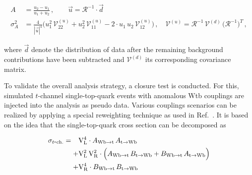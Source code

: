 \begin{align}
A&=\frac{u_2-u_1}{u_1+u_2}\,,\qquad \vec{u}=\mathcal{R}^{-1}\cdot\vec{d}\\
\sigma^2_{A}&=\frac{4}{|\vec{u}|^4}\Big(u_1^2\,\mathcal{V}^{(u)}_{22}+u_2^2\,\mathcal{V}^{(u)}_{11}-2\cdot u_1\,u_{2}\,\mathcal{V}^{(u)}_{12}\Big)\,,\quad\mathcal{V}^{(u)}=\mathcal{R}^{-1}\,\mathcal{V}^{(d)}\,\big(\mathcal{R}^{-1}\big)^{T}\,,
\end{align}

where $\vec{d}$ denote the distribution of data after the remaining background contributions have been subtracted and $\mathcal{V}^{(d)}$ its corresponding covariance matrix.

To validate the overall analysis strategy, a closure test is conducted. For this, simulated $t$-channel single-top-quark events with anomalous Wtb couplings are injected into the analysis as pseudo data. Various couplings scenarios can be realized by applying a special reweighting technique as used in Ref.~\cite{Khachatryan:2016sib}. It is based on the idea that the single-top-quark cross section can be decomposed as

\begin{subequations}
\begin{align}
\sigma_{t\mathrm{\mbox{-}ch.}}=\hphantom{+}&\mathrm{V}_\mathrm{L}^4\cdot A_{\mathrm{Wb}\to\mathrm{t}}\,A_{\mathrm{t}\to\mathrm{Wb}}\label{eq:polarization-wtb-rew-vl}\\+&\mathrm{V}_\mathrm{L}^2\,\mathrm{V}_\mathrm{R}^2\cdot \Big(A_{\mathrm{Wb}\to\mathrm{t}}\,B_{\mathrm{t}\to\mathrm{Wb}}+B_{\mathrm{Wb}\to\mathrm{t}}\,A_{\mathrm{t}\to\mathrm{Wb}}\Big)\label{eq:polarization-wtb-rew-vlvr}\\+&\mathrm{V}_\mathrm{R}^4\cdot B_{\mathrm{Wb}\to\mathrm{t}}\,B_{\mathrm{t}\to\mathrm{Wb}}\label{eq:polarization-wtb-rew-vr}
\end{align}
\end{subequations}

